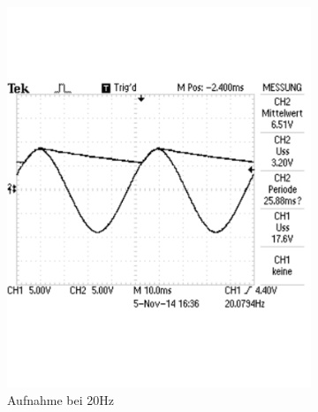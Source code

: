 \documentclass[12pt,a4paper]{article}
\begin{document}
\begin{figure}[H]
        \centering
        \begin{subfigure}[b]{0.48\textwidth}
                \includegraphics[width=\textwidth , scale = 0.4]{2_2_10F_1.pdf}
                \caption[Aufnahme bei 20Hz]{Aufnahme bei 20Hz}
 				 \label{fig:2_2_10F_1}
        \end{subfigure}%
        \hfill
        \begin{subfigure}[b]{0.48\textwidth}

\end{subfigure}
\end{figure}
\end{document}
